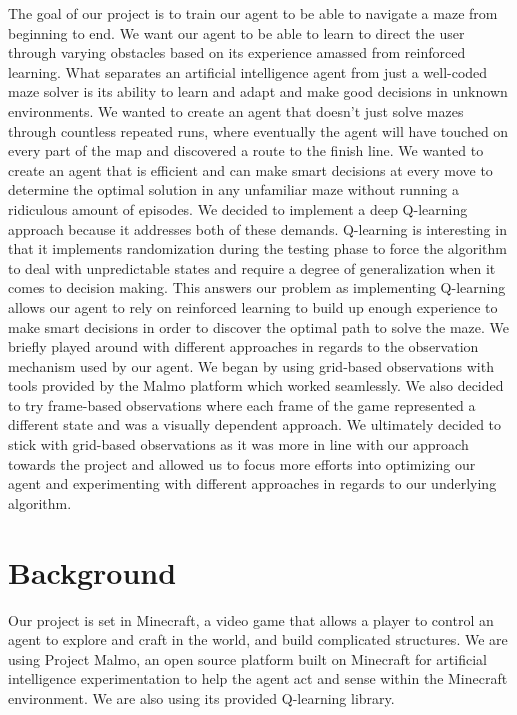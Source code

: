 \documentclass{article}
\begin{document}
The goal of our project is to train our agent to be able to navigate a maze from beginning to end. We want our agent to be able to learn to direct the user through varying obstacles based on its experience amassed from reinforced learning. What separates an artificial intelligence agent from just a well-coded maze solver is its ability to learn and adapt and make good decisions in unknown environments. We wanted to create an agent that doesn't just solve mazes through countless repeated runs, where eventually the agent will have touched on every part of the map and discovered a route to the finish line. We wanted to create an agent that is efficient and can make smart decisions at every move to determine the optimal solution in any unfamiliar maze without running a ridiculous amount of episodes. We decided to implement a deep Q-learning approach because it addresses both of these demands. Q-learning is interesting in that it implements randomization during the testing phase to force the algorithm to deal with unpredictable states and require a degree of generalization when it comes to decision making. This answers our problem as implementing Q-learning allows our agent to rely on reinforced learning to build up enough experience to make smart decisions in order to discover the optimal path to solve the maze. We briefly played around with different approaches in regards to the observation mechanism used by our agent. We began by using grid-based observations with tools provided by the Malmo platform which worked seamlessly. We also decided to try frame-based observations where each frame of the game represented a different state and was a visually dependent approach. We ultimately decided to stick with grid-based observations as it was more in line with our approach towards the project and allowed us to focus more efforts into optimizing our agent and experimenting with different approaches in regards to our underlying algorithm. 

\section{Background}

Our project is set in Minecraft, a video game that allows a player to control an agent to explore and craft in the world, and build complicated structures. We are using Project Malmo, an open source platform built on Minecraft for artificial intelligence experimentation to help the agent act and sense within the Minecraft environment. We are also using its provided Q-learning library. 
\end{document}
